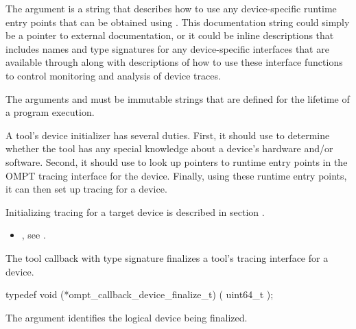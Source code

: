 The argument  is a string that describes
how to use any device-specific runtime
entry points that can be obtained using . This
documentation string could simply be a pointer to external
documentation, or it could be inline descriptions
that includes names and type signatures for any
device-specific interfaces that are available through 
along with descriptions of how to use these interface functions to
control monitoring and analysis of device traces.

\constraints
The arguments  and  must be
immutable strings that are defined for the lifetime of a program
execution.

\effect

A tool's device initializer has several duties.  First, it should use
 to determine whether the tool has any special knowledge
about a device's hardware and/or software.  Second, it should use
 to look up pointers to runtime entry points in the OMPT tracing
interface for the device.  Finally, using these runtime entry points, it can
then set up tracing for a device.

Initializing tracing for a target device is described in section
.

\crossreferences
\begin{itemize}
\item {}, see
  .
\end{itemize}


\label{sec:ompt_callback_device_finalize_t}

\summary The tool callback with type signature
 finalizes a
tool's tracing interface for a device.

\format

\begin{ccppspecific}
\begin{omptCallback}
typedef void (*ompt_callback_device_finalize_t) (
  uint64_t 
);
\end{omptCallback}
\end{ccppspecific}


\argdesc

The argument  identifies the logical device
being finalized.

